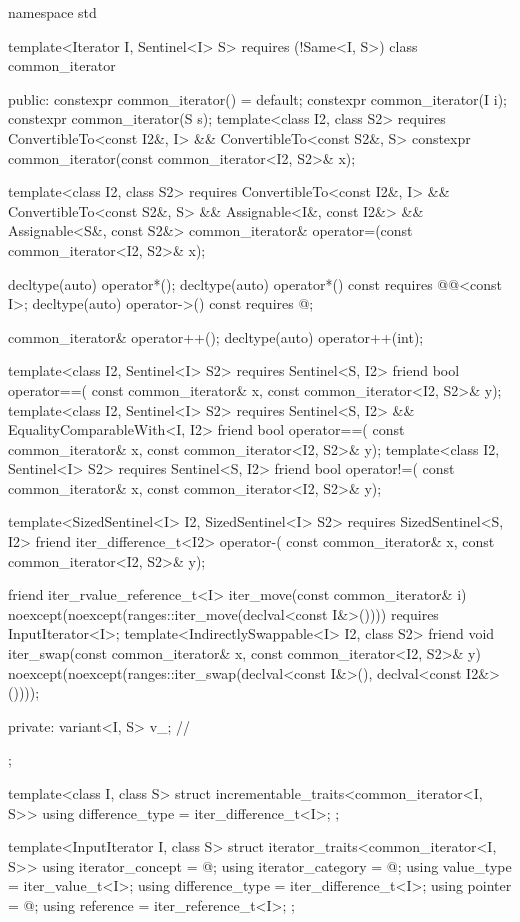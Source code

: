 %
\begin{codeblock}
namespace std {
  template<Iterator I, Sentinel<I> S>
    requires (!Same<I, S>)
  class common_iterator {
  public:
    constexpr common_iterator() = default;
    constexpr common_iterator(I i);
    constexpr common_iterator(S s);
    template<class I2, class S2>
      requires ConvertibleTo<const I2&, I> && ConvertibleTo<const S2&, S>
        constexpr common_iterator(const common_iterator<I2, S2>& x);

    template<class I2, class S2>
      requires ConvertibleTo<const I2&, I> && ConvertibleTo<const S2&, S> &&
               Assignable<I&, const I2&> && Assignable<S&, const S2&>
        common_iterator& operator=(const common_iterator<I2, S2>& x);

    decltype(auto) operator*();
    decltype(auto) operator*() const
      requires @@<const I>;
    decltype(auto) operator->() const
      requires @\seebelow@;

    common_iterator& operator++();
    decltype(auto) operator++(int);

    template<class I2, Sentinel<I> S2>
      requires Sentinel<S, I2>
    friend bool operator==(
      const common_iterator& x, const common_iterator<I2, S2>& y);
    template<class I2, Sentinel<I> S2>
      requires Sentinel<S, I2> && EqualityComparableWith<I, I2>
    friend bool operator==(
      const common_iterator& x, const common_iterator<I2, S2>& y);
    template<class I2, Sentinel<I> S2>
      requires Sentinel<S, I2>
    friend bool operator!=(
      const common_iterator& x, const common_iterator<I2, S2>& y);

    template<SizedSentinel<I> I2, SizedSentinel<I> S2>
      requires SizedSentinel<S, I2>
    friend iter_difference_t<I2> operator-(
      const common_iterator& x, const common_iterator<I2, S2>& y);

    friend iter_rvalue_reference_t<I> iter_move(const common_iterator& i)
      noexcept(noexcept(ranges::iter_move(declval<const I&>())))
        requires InputIterator<I>;
    template<IndirectlySwappable<I> I2, class S2>
      friend void iter_swap(const common_iterator& x, const common_iterator<I2, S2>& y)
        noexcept(noexcept(ranges::iter_swap(declval<const I&>(), declval<const I2&>())));

  private:
    variant<I, S> v_;   // \expos
  };

  template<class I, class S>
  struct incrementable_traits<common_iterator<I, S>> {
    using difference_type = iter_difference_t<I>;
  };

  template<InputIterator I, class S>
  struct iterator_traits<common_iterator<I, S>> {
    using iterator_concept = @\seebelow@;
    using iterator_category = @\seebelow@;
    using value_type = iter_value_t<I>;
    using difference_type = iter_difference_t<I>;
    using pointer = @\seebelow@;
    using reference = iter_reference_t<I>;
  };
}
\end{codeblock}


